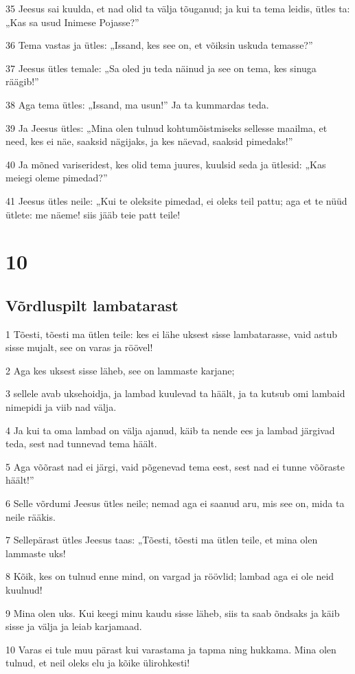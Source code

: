 \par 35 Jeesus sai kuulda, et nad olid ta välja tõuganud; ja kui ta tema leidis, ütles ta: „Kas sa usud Inimese Pojasse?”
\par 36 Tema vastas ja ütles: „Issand, kes see on, et võiksin uskuda temasse?”
\par 37 Jeesus ütles temale: „Sa oled ju teda näinud ja see on tema, kes sinuga räägib!”
\par 38 Aga tema ütles: „Issand, ma usun!” Ja ta kummardas teda.
\par 39 Ja Jeesus ütles: „Mina olen tulnud kohtumõistmiseks sellesse maailma, et need, kes ei näe, saaksid nägijaks, ja kes näevad, saaksid pimedaks!”
\par 40 Ja mõned variseridest, kes olid tema juures, kuulsid seda ja ütlesid: „Kas meiegi oleme pimedad?”
\par 41 Jeesus ütles neile: „Kui te oleksite pimedad, ei oleks teil pattu; aga et te nüüd ütlete: me näeme! siis jääb teie patt teile!


\chapter{10}

\section*{Võrdluspilt lambatarast}

\par 1 Tõesti, tõesti ma ütlen teile: kes ei lähe uksest sisse lambatarasse, vaid astub sisse mujalt, see on varas ja röövel!
\par 2 Aga kes uksest sisse läheb, see on lammaste karjane;
\par 3 sellele avab uksehoidja, ja lambad kuulevad ta häält, ja ta kutsub omi lambaid nimepidi ja viib nad välja.
\par 4 Ja kui ta oma lambad on välja ajanud, käib ta nende ees ja lambad järgivad teda, sest nad tunnevad tema häält.
\par 5 Aga võõrast nad ei järgi, vaid põgenevad tema eest, sest nad ei tunne võõraste häält!”
\par 6 Selle võrdumi Jeesus ütles neile; nemad aga ei saanud aru, mis see on, mida ta neile rääkis.
\par 7 Sellepärast ütles Jeesus taas: „Tõesti, tõesti ma ütlen teile, et mina olen lammaste uks!
\par 8 Kõik, kes on tulnud enne mind, on vargad ja röövlid; lambad aga ei ole neid kuulnud!
\par 9 Mina olen uks. Kui keegi minu kaudu sisse läheb, siis ta saab õndsaks ja käib sisse ja välja ja leiab karjamaad.
\par 10 Varas ei tule muu pärast kui varastama ja tapma ning hukkama. Mina olen tulnud, et neil oleks elu ja kõike ülirohkesti!

